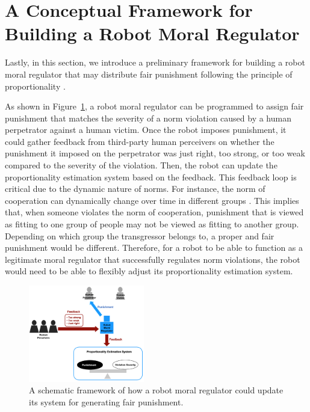 \documentclass{article} %
\begin{document}
\section{A Conceptual Framework for Building a Robot Moral Regulator}
Lastly, in this section, we introduce a preliminary framework for building a robot moral regulator that may distribute fair punishment following the principle of proportionality \cite{darley2003psychology,sep-justice-retributive}.

As shown in Figure~\ref{fig:AIHRIFigure1}, a robot moral regulator can be programmed to assign fair punishment that matches the severity of a norm violation caused by a human perpetrator against a human victim. Once the robot imposes punishment, it could gather feedback from third-party human perceivers on whether the punishment it imposed on the perpetrator was just right, too strong, or too weak compared to the severity of the violation. Then, the robot can update the proportionality estimation system based on the feedback. This feedback loop is critical due to the dynamic nature of norms. For instance, the norm of cooperation can dynamically change over time in different groups \cite{titlestad2019dynamic}. This implies that, when someone violates the norm of cooperation, punishment that is viewed as fitting to one group of people may not be viewed as fitting to another group. Depending on which group the transgressor belongs to, a proper and fair punishment would be different. Therefore, for a robot to be able to function as a legitimate moral regulator that successfully regulates norm violations, the robot would need to be able to flexibly adjust its proportionality estimation system.

\begin{figure}[h]
\centering
\includegraphics[width=0.45\textwidth]{AIHRIFigure1.png}
\caption{A schematic framework of how a robot moral regulator could update its system for generating fair punishment.}
\label{fig:AIHRIFigure1}
\end{figure}
\end{document}
